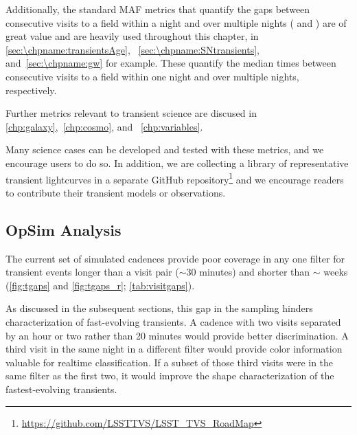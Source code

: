 Additionally, the standard MAF metrics
that quantify the gaps between consecutive visits to
a field within a night and over multiple nights
( and )
are of great value and are
heavily used throughout this chapter, in \autoref{sec:\chpname:transientsAge},
~\autoref{sec:\chpname:SNtransients}, and~\autoref{sec:\chpname:gw} for example.
These quantify the median times between consecutive visits to a field
within one night and over multiple nights, respectively.

Further metrics relevant to transient science are discused in \autoref{chp:galaxy},~\autoref{chp:cosmo}, and ~\autoref{chp:variables}.

Many science cases can be developed and tested with these metrics, and we
encourage users to do so. In addition, we are collecting a library of representative transient lightcurves in a separate GitHub repository\footnote{\url{https://github.com/LSSTTVS/LSST_TVS_RoadMap}} and we encourage readers to contribute their transient models or observations.



\subsection{OpSim Analysis}
\label{sec:\chpname:analysis}

The current set of simulated cadences
provide poor coverage in any one
filter for transient events longer than a visit pair ($\sim$30
minutes) and shorter than $\sim$ weeks (\autoref{fig:tgaps} and
\autoref{fig:tgaps_r}; \autoref{tab:visitgaps}).

As discussed in the subsequent sections, this
gap in the sampling hinders characterization of fast-evolving
transients.  A cadence with two visits separated by an hour or two rather
than 20 minutes would provide better discrimination.  A third visit in the
same night in a different filter would provide
color information valuable for realtime classification.
If a subset of those third
visits were in the same filter as the first two, it would improve the shape
characterization of the fastest-evolving transients.

